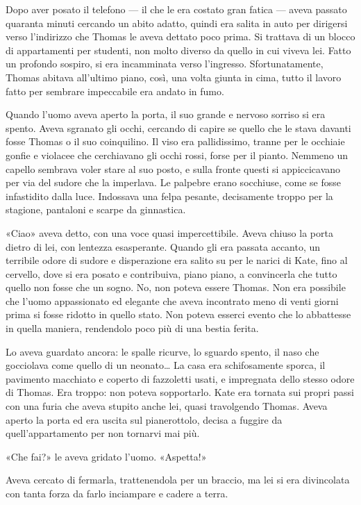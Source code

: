 \documentclass[a4paper,oneside,11pt]{memoir}
\begin{document}
Dopo aver posato il telefono --- il che le era costato gran fatica --- aveva passato quaranta minuti cercando un abito
adatto, quindi era salita in auto per dirigersi verso l'indirizzo che Thomas le aveva dettato poco prima. Si trattava di
un blocco di appartamenti per studenti, non molto diverso da quello in cui viveva lei. Fatto un profondo sospiro, si
era incamminata verso l'ingresso. Sfortunatamente, Thomas abitava all'ultimo piano, così, una volta giunta in cima,
tutto il lavoro fatto per sembrare impeccabile era andato in fumo.

Quando l'uomo aveva aperto la porta, il suo grande e nervoso sorriso si era spento. Aveva sgranato gli occhi, cercando
di capire se quello che le stava davanti fosse Thomas o il suo coinquilino. Il viso era pallidissimo, tranne per le
occhiaie gonfie e violacee che cerchiavano gli occhi rossi, forse per il pianto. Nemmeno un capello sembrava voler stare
al suo posto, e sulla fronte questi si appiccicavano per via del sudore che la imperlava. Le palpebre erano socchiuse,
come se fosse infastidito dalla luce. Indossava una felpa pesante, decisamente troppo per la stagione, pantaloni e
scarpe da ginnastica.

«Ciao» aveva detto, con una voce quasi impercettibile. Aveva chiuso la porta dietro di lei, con lentezza esasperante.
Quando gli era passata accanto, un terribile odore di sudore e disperazione era salito su per le narici di Kate, fino al
cervello, dove si era posato e contribuiva, piano piano, a convincerla che tutto quello non fosse che un sogno. No, non
poteva essere Thomas. Non era possibile che l'uomo appassionato ed elegante che aveva incontrato meno di venti giorni
prima si fosse ridotto in quello stato. Non poteva esserci evento che lo abbattesse in quella maniera, rendendolo poco
più di una bestia ferita.

Lo aveva guardato ancora: le spalle ricurve, lo sguardo spento, il naso che gocciolava come quello di un neonato\dots{}
La casa era schifosamente sporca, il pavimento macchiato e coperto di fazzoletti usati, e impregnata dello stesso odore
di Thomas. Era troppo: non poteva sopportarlo. Kate era tornata sui propri passi con una furia che aveva stupito anche
lei, quasi travolgendo Thomas. Aveva aperto la porta ed era uscita sul pianerottolo, decisa a fuggire da
quell'appartamento per non tornarvi mai più.

«Che fai?» le aveva gridato l'uomo. «Aspetta!»

Aveva cercato di fermarla, trattenendola per un braccio, ma lei si era divincolata con tanta forza da farlo inciampare e
cadere a terra.
\end{document}
